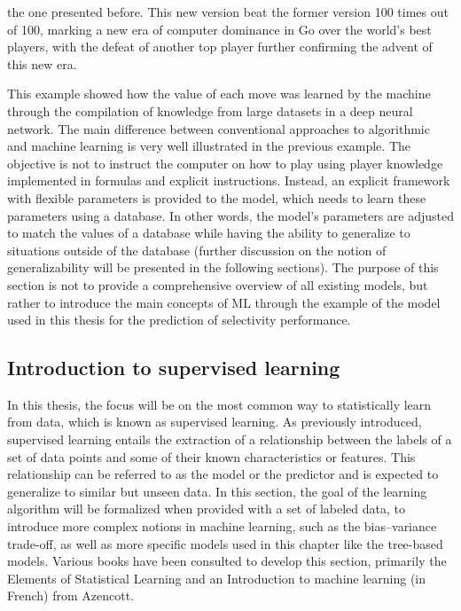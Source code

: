 \documentclass[main]{subfiles}
\begin{document}
the one presented before. This new version beat the former version 100 times out of 100,\autocite{Silver_2017} marking a new era of computer dominance in Go over the world's best players, with the defeat of another top player further confirming the advent of this new era.

This example showed how the value of each move was learned by the machine through the compilation of knowledge from large datasets in a deep neural network. The main difference between conventional approaches to algorithmic and machine learning is very well illustrated in the previous example. The objective is not to instruct the computer on how to play using player knowledge implemented in formulas and explicit instructions. Instead, an explicit framework with flexible parameters is provided to the model, which needs to learn these parameters using a database. In other words, the model's parameters are adjusted to match the values of a database while having the ability to generalize to situations outside of the database (further discussion on the notion of generalizability will be presented in the following sections). The purpose of this section is not to provide a comprehensive overview of all existing models, but rather to introduce the main concepts of ML through the example of the model used in this thesis for the prediction of selectivity performance.

\subsection{Introduction to supervised learning}

In this thesis, the focus will be on the most common way to statistically learn from data, which is known as supervised learning. As previously introduced, supervised learning entails the extraction of a relationship between the labels of a set of data points and some of their known characteristics or features. This relationship can be referred to as the model or the predictor and is expected to generalize to similar but unseen data. In this section, the goal of the learning algorithm will be formalized when provided with a set of labeled data, to introduce more complex notions in machine learning, such as the bias--variance trade-off, as well as more specific models used in this chapter like the tree-based models. Various books have been consulted to develop this section, primarily the Elements of Statistical Learning\autocite{Hastie_2009} and an Introduction to machine learning (in French) from Azencott\autocite{azencott2022introduction}.
\end{document}
